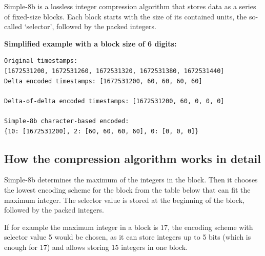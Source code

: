 Simple-8b is a lossless integer compression algorithm that stores data as a
series of fixed-size blocks. Each block starts with the size of its contained
units, the so-called `selector', followed by the packed integers.

\textbf{Simplified example with a block size of 6 digits:}

\begin{verbatim}
Original timestamps:
[1672531200, 1672531260, 1672531320, 1672531380, 1672531440]
Delta encoded timestamps: [1672531200, 60, 60, 60, 60]

Delta-of-delta encoded timestamps: [1672531200, 60, 0, 0, 0]

Simple-8b character-based encoded: 
{10: [1672531200], 2: [60, 60, 60, 60], 0: [0, 0, 0]}
\end{verbatim}



\subsection{How the compression algorithm works in detail}

Simple-8b determines the maximum of the integers in the block. Then it chooses
the lowest encoding scheme for the block from the table below that can fit the
maximum integer. The selector value is stored at the beginning of the block,
followed by the packed integers.

\begin{table}[ht]
  \centering
  \small
  \caption{Encoding mode for Simple-8 scheme. Between 1 and 240 integers are coded with one 64-bit word.}
\end{table}

If for example the maximum integer in a block is 17, the encoding scheme with
selector value 5 would be chosen, as it can store integers up to 5 bits (which
is enough for 17) and allows storing 15 integers in one block.

